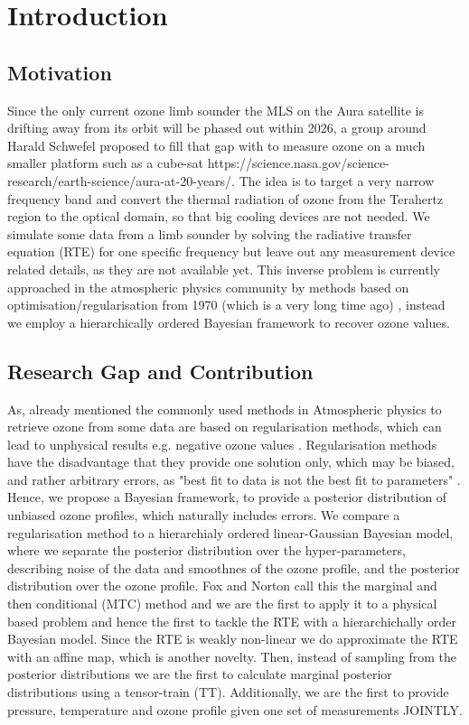 \chapter{Introduction}
\section{Motivation}

Since the only current ozone limb sounder the MLS on the Aura satellite is drifting away from its orbit will be phased out within 2026, a group around Harald Schwefel proposed to fill that gap with to measure ozone on a much smaller platform such as a cube-sat  https://science.nasa.gov/science-research/earth-science/aura-at-20-years/. \cite{ustin2024current}
The idea is to target a very narrow frequency band and convert the thermal radiation of ozone from the Terahertz region to the optical domain, so that big cooling devices are not needed.
We simulate some data from a limb sounder by solving the radiative transfer equation (RTE) for one specific frequency but leave out any measurement device related details, as they are not available yet.
This inverse problem is currently approached in the atmospheric physics community by methods based on optimisation/regularisation from 1970 (which is a very long time ago) \cite{}, instead we employ a hierarchically ordered Bayesian framework to recover ozone values.


\section{Research Gap and Contribution}
As, already mentioned the commonly used methods in Atmospheric physics to retrieve ozone from some data are based on regularisation methods, which can lead to unphysical results e.g. negative ozone values \cite{MLSdata}.
Regularisation methods have the disadvantage that they provide one solution only, which may be biased, and rather arbitrary errors, as "best fit to data is not the best fit to parameters" \cite{tan2016LecNot}.
Hence, we propose a Bayesian framework, to provide a posterior distribution of unbiased ozone profiles, which naturally includes errors.
We compare a regularisation method to a hierarchialy ordered linear-Gaussian Bayesian model, where we separate the posterior distribution over the hyper-parameters, describing noise of the data and smoothnes of the ozone profile, and the posterior distribution over the ozone profile.
Fox and Norton call this the marginal and then conditional (MTC) method \cite{} and we are the first to apply it to a physical based problem and hence the first to tackle the RTE with a hierarchichally order Bayesian model.
Since the RTE is weakly non-linear we do approximate the RTE with an affine map, which is another novelty.
Then, instead of sampling from the posterior distributions we are the first to calculate marginal posterior distributions using a tensor-train (TT).
Additionally, we are the first to provide pressure, temperature and ozone profile given one set of measurements JOINTLY. \cite{}
